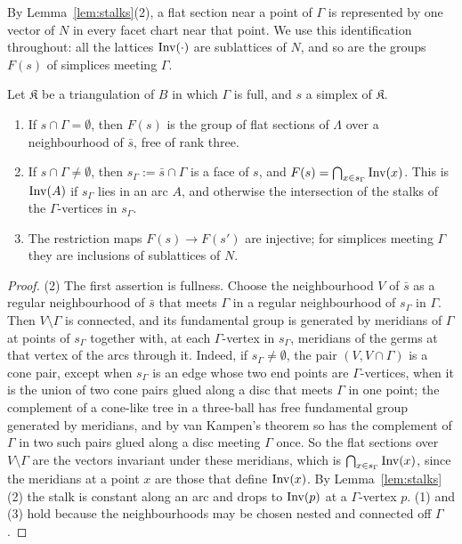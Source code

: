 By Lemma~\ref{lem:stalks}(2), a flat section near a point of $\Gamma$ is represented by one vector of $N$ in every
facet chart near that point. We use this identification throughout: all the lattices $\operatorname{Inv}(\cdot)$ are sublattices
of $N$, and so are the groups $F(s)$ of simplices meeting $\Gamma$.

\begin{lemma}\label{lem:coef}
Let $\mathfrak K$ be a triangulation of $B$ in which $\Gamma$ is full, and $s$ a simplex of $\mathfrak K$.
\begin{enumerate}
\item If $s\cap\Gamma=\emptyset$, then $F(s)$ is the group of flat sections of $\Lambda$ over a neighbourhood of $\bar s$,
free of rank three.
\item If $s\cap\Gamma\ne\emptyset$, then $s_\Gamma:=\bar s\cap\Gamma$ is a face of $s$, and $F(s)=\bigcap_{x\in
s_\Gamma}\operatorname{Inv}(x)$. This is $\operatorname{Inv}(A)$ if $s_\Gamma$ lies in an arc $A$, and otherwise the intersection of the
stalks of the $\Gamma$-vertices in $s_\Gamma$.
\item The restriction maps $F(s)\to F(s')$ are injective; for simplices meeting $\Gamma$ they are inclusions of
sublattices of $N$.
\end{enumerate}
\end{lemma}

\begin{proof}
(2) The first assertion is fullness. Choose the neighbourhood $V$ of $\bar s$ as a regular neighbourhood of $\bar s$ that
meets $\Gamma$ in a regular neighbourhood of $s_\Gamma$ in $\Gamma$. Then $V\setminus\Gamma$ is connected, and its fundamental
group is generated by meridians of $\Gamma$ at points of $s_\Gamma$ together with, at each $\Gamma$-vertex in $s_\Gamma$,
meridians of the germs at that vertex of the arcs through it. Indeed, if $s_\Gamma\neq\emptyset$, the pair $(V,V\cap\Gamma)$
is a cone pair, except when $s_\Gamma$ is an edge whose two end points are $\Gamma$-vertices, when it is the union of two cone
pairs glued along a disc that meets $\Gamma$ in one point; the complement of a cone-like tree in a three-ball has free
fundamental group generated by meridians, and by van Kampen's theorem so has the complement of $\Gamma$ in two such pairs
glued along a disc meeting $\Gamma$ once. So the flat sections over $V\setminus\Gamma$ are the vectors invariant under these meridians, which is
$\bigcap_{x\in s_\Gamma}\operatorname{Inv}(x)$, since the meridians at a point $x$ are those that define $\operatorname{Inv}(x)$. By
Lemma~\ref{lem:stalks}(2) the stalk is constant along an arc and drops to $\operatorname{Inv}(p)$ at a $\Gamma$-vertex $p$. (1) and
(3) hold because the neighbourhoods may be chosen nested and connected off $\Gamma$.
\end{proof}

